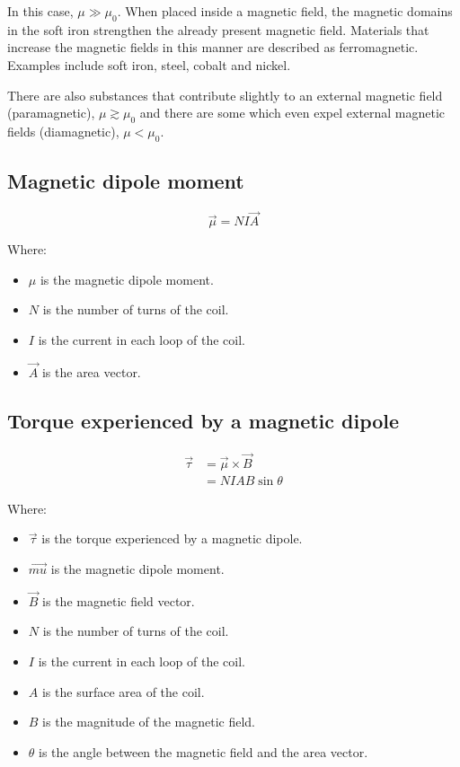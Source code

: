 \documentclass[11pt]{article}
\begin{document}
In this case, \(\mu \gg \mu_0\). When placed inside a magnetic field, the magnetic domains in the soft iron strengthen the already present magnetic field. Materials that increase the magnetic fields in this manner are described as ferromagnetic. Examples include soft iron, steel, cobalt and nickel.


There are also substances that contribute slightly to an external magnetic field (paramagnetic), \(\mu \gtrsim \mu_0\) and there are some which even expel external magnetic fields (diamagnetic), \(\mu < \mu_0\).
\subsection{Magnetic dipole moment}
\label{sec:orga6640fb}
\[\vec{\mu} = NI \vec{A}\]

Where:
\begin{itemize}
\item \(\mu\) is the magnetic dipole moment.
\item \(N\) is the number of turns of the coil.
\item \(I\) is the current in each loop of the coil.
\item \(\vec{A}\) is the area vector.
\end{itemize}
\subsection{Torque experienced by a magnetic dipole}
\label{sec:org2d0d1b1}
\begin{align*}
\vec{\tau} &= \vec{\mu} \times \vec{B} \\
&= NIA B \sin \theta
\end{align*}

Where:
\begin{itemize}
\item \(\vec{\tau}\) is the torque experienced by a magnetic dipole.
\item \(\vec{mu}\) is the magnetic dipole moment.
\item \(\vec{B}\) is the magnetic field vector.
\item \(N\) is the number of turns of the coil.
\item \(I\) is the current in each loop of the coil.
\item \(A\) is the surface area of the coil.
\item \(B\) is the magnitude of the magnetic field.
\item \(\theta\) is the angle between the magnetic field and the area vector.
\end{itemize}
\end{document}
